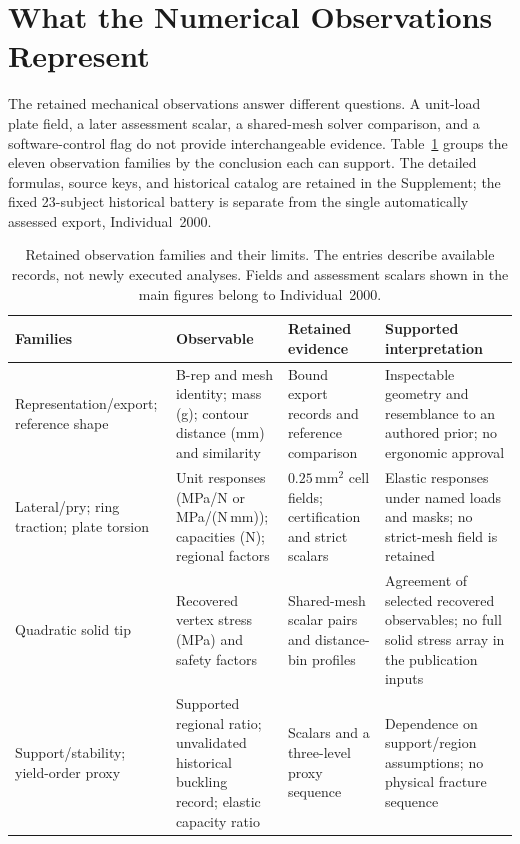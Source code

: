 \section{What the Numerical Observations Represent}
\label{sec:battery}
The retained mechanical observations answer different questions. A unit-load plate field, a later assessment scalar, a shared-mesh solver comparison, and a software-control flag do not provide interchangeable evidence. Table~\ref{tab:observation-families} groups the eleven observation families by the conclusion each can support. The detailed formulas, source keys, and historical catalog are retained in the Supplement; the fixed 23-subject historical battery is separate from the single automatically assessed export, Individual~2000.

\begin{table}[t]
\centering
\caption{Retained observation families and their limits. The entries describe available records, not newly executed analyses. Fields and assessment scalars shown in the main figures belong to Individual~2000.}
\label{tab:observation-families}
\small
\setlength{\tabcolsep}{4pt}
\renewcommand{\arraystretch}{1.12}
\begin{tabular}{@{}>{\raggedright\arraybackslash}p{}>{\raggedright\arraybackslash}p{}>{\raggedright\arraybackslash}p{}>{\raggedright\arraybackslash}p{}@{}}
\toprule
\textbf{Families} & \textbf{Observable} & \textbf{Retained evidence} & \textbf{Supported interpretation} \\
\midrule
Representation/export; reference shape & B-rep and mesh identity; mass (g); contour distance (mm) and similarity & Bound export records and reference comparison & Inspectable geometry and resemblance to an authored prior; no ergonomic approval \\
Lateral/pry; ring traction; plate torsion & Unit responses (MPa/N or MPa/(N\,mm)); capacities (N); regional factors & $0.25\,\mathrm{mm}^2$ cell fields; certification and strict scalars & Elastic responses under named loads and masks; no strict-mesh field is retained \\
Quadratic solid tip & Recovered vertex stress (MPa) and safety factors & Shared-mesh scalar pairs and distance-bin profiles & Agreement of selected recovered observables; no full solid stress array in the publication inputs \\
Support/stability; yield-order proxy & Supported regional ratio; unvalidated historical buckling record; elastic capacity ratio & Scalars and a three-level proxy sequence & Dependence on support/region assumptions; no physical fracture sequence \\

\end{tabular}
\end{table}
